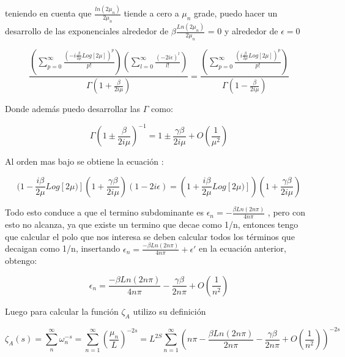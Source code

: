 teniendo en cuenta que $\frac{ln(2 \mu _n)}{2 \mu _n }$ tiende a cero a $\mu _n$ grade, puedo hacer un desarrollo de las exponenciales alrededor de $ \beta \frac{Ln(2\mu _n)}{2\mu _n}$ = 0 y alrededor de $\epsilon = 0$

\begin{equation}
	\frac{
    \left(
    \sum _{p = 0} ^{\infty} 
    \frac{(-i \frac{\beta}{2 \mu} Log[2 \mu] ) ^p }{p!}
    \right)
    \left(
    \sum _{l = 0} ^{\infty} \frac{(- 2 i \epsilon)^l}{l !}
    \right)
    }
    {\Gamma  ( 1 + \frac{ \beta}{2 i \mu} ) }
    =
    \frac{
    \left(
    \sum _{p = 0} ^{\infty} \frac{( i \frac{\beta}{2 \mu} Log[2 \mu]) ^p }{p!}
    \right)
    }
    { \Gamma  (1 - \frac{ \beta}{2 i \mu}) }
\end{equation}

Donde además puedo desarrollar las $\Gamma$ como: 

\begin{equation}
    \Gamma(1 \pm \frac{ \beta}{2 i \mu})^{-1} = 1 \pm \frac{ \gamma \beta }{2 i \mu }
    + O(\frac{1}{\mu ^2})
\end{equation}

Al orden mas bajo se obtiene la ecuación : 

\begin{equation}
(1- \frac{i \beta}{2 \mu} Log[2 \mu)] 
(1 + \frac{ \gamma \beta}{2 i \mu}) 
(1 - 2 i \epsilon) =
(1+ \frac{ i \beta}{2 \mu} Log[2 \mu)] )
(1 + \frac{ \gamma \beta}{2 i \mu})
\end{equation}

Todo esto conduce a que el termino subdominante es $\epsilon _n = - \frac{\beta Ln(2 n \pi)}{4 n \pi}$ , pero con esto no alcanza, ya que existe un termino que decae como 1/n, entonces tengo que calcular el polo que nos interesa se deben calcular todos los términos que decaigan como 1/n, insertando $\epsilon _n =  \frac{-\beta Ln(2 n \pi)}{4 n \pi} + \epsilon '$ en la ecuación anterior, obtengo:


\begin{equation}
    \epsilon _n =  \frac{-\beta Ln(2 n \pi)}{4 n \pi} 
                -\frac{\gamma \beta}{2 n \pi} +
                O(\frac{1}{n^2})
\end{equation}

Luego para calcular la función $\zeta _{A}$ utilizo su definición

\begin{equation}
    \zeta _A (s) = \sum _n ^{\infty} \omega _n ^{-s}  =
    \sum _{n=1} ^{\infty} \left(\frac{\mu _n}{L} \right) ^{-2 s} = 
    L ^{2 S} \sum _{n=1} ^{\infty} 
    \left( 
    n \pi - \frac{\beta Ln(2 n \pi)}{2 n \pi} - \frac{\gamma \beta}{2 n \pi} +
    O(\frac{1}{n^2})
    \right) ^{-2s}
\end{equation}

